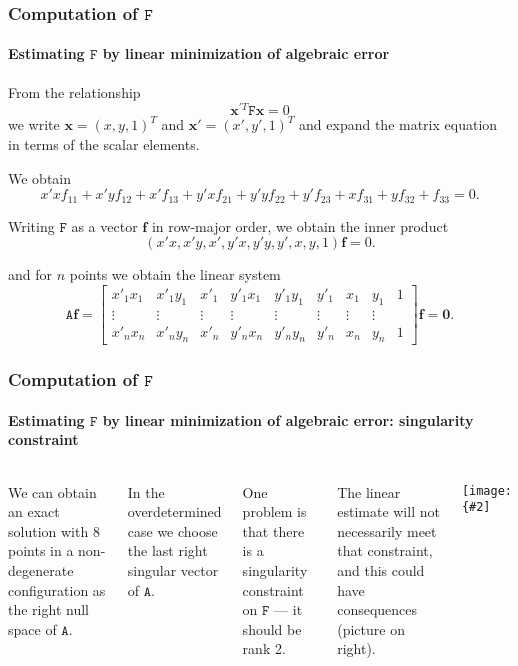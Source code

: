 \documentclass[aspectratio=169]{beamer}
\renewcommand{\vec}[1]{\boldsymbol{#1}}
\newcommand{\mat}[1]{\mathtt{#1}}
\newcommand{\myfig}[3]{\centerline{\texttt{[image: \{\#2]}}}
    \centerline{\scriptsize #3}}
\begin{document}
\begin{frame}
\frametitle{Computation of $\mat{F}$}
\framesubtitle{Estimating $\mat{F}$ by linear minimization of
  algebraic error}

From the relationship
\begin{equation*}
\vec{x}^{\prime T}\mat{F}\vec{x} = 0
\end{equation*}
we write $\vec{x} = (x,y,1)^T$ and $\vec{x}' = (x',y',1)^T$ and expand
the matrix equation in terms of the scalar elements.

\medskip

We obtain
\begin{equation*}
x'xf_{11}+x'yf_{12}+x'f_{13}+
y'xf_{21}+y'yf_{22}+y'f_{23}+
xf_{31}+yf_{32}+f_{33}=0.
\end{equation*}

Writing $\mat{F}$ as a vector $\vec{f}$ in row-major order, we obtain
the inner product
\begin{equation*}
(x'x, x'y, x', y'x, y'y, y', x, y, 1)\vec{f} = 0.
\end{equation*}

and for $n$ points we obtain the linear system
\begin{equation*}
\mat{A}\vec{f}=\begin{bmatrix}
x'_1x_1 & x'_1y_1 & x'_1 & y'_1x_1 & y'_1y_1 & y'_1 & x_1 & y_1 & 1 \\
\vdots & \vdots & \vdots & \vdots & \vdots & \vdots & \vdots & \vdots & \\
x'_nx_n & x'_ny_n & x'_n & y'_nx_n & y'_ny_n & y'_n & x_n & y_n & 1
\end{bmatrix}\vec{f}=\vec{0}.
\end{equation*}

\end{frame}

\begin{frame}
\frametitle{Computation of $\mat{F}$}
\framesubtitle{Estimating $\mat{F}$ by linear minimization of
  algebraic error: singularity constraint}

\begin{columns}
\column{2.5in}
We can obtain an \alert{exact solution} with 8 points in a
non-degenerate configuration as the right null space of $\mat{A}$.

\medskip

In the \alert{overdetermined} case we choose the last right singular
vector of $\mat{A}$.

\medskip

One problem is that there is a
\alert{singularity constraint} on $\mat{F}$ --- it should be rank
2.

\medskip

The linear estimate will not necessarily meet that constraint, and
this could have consequences (picture on right).

\column{2in}
\myfig{1.9in}{HZ-fig10-1a}{Hartley and Zisserman (2004), Fig.\ 11.1(a)}

\end{columns}

\end{frame}
\end{document}
